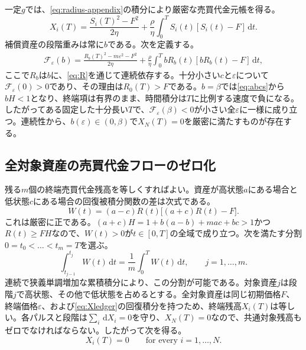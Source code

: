\documentclass[11pt]{article}
\numberwithin{equation}{section}
\theoremstyle{definition}
\theoremstyle{remark}
\newcommand{\dd}{\,\mathrm{d}}
\begin{document}
一定$g$では、\eqref{eq:radius-appendix}の積分により厳密な売買代金元帳を得る。
\begin{equation}\label{eq:Xledger}
X_i(T)=\frac{S_i(T)^2-F^2}{2\eta}
+\frac\rho\eta\int_0^T S_i(t)[S_i(t)-F]\dd t.
\end{equation}
補償資産の段階重みは常に$b$である。次を定義する。
\begin{align}\label{eq:compensator}
\mathcal F_\varepsilon(b)=\frac{R_b(T)^2-m\varepsilon^2-F^2}{2\eta}
+\frac\rho\eta\int_0^T bR_b(t)[bR_b(t)-F]\dd t,
\end{align}
ここで$R_b$は$b$に、\eqref{eq:R}を通じて連続依存する。十分小さい$c$と$\varepsilon$について$\mathcal F_\varepsilon(0)>0$であり、その理由は$R_0(T)>F$である。$b=\beta$では\eqref{eq:abcs}から$bH<1$となり、終端項は有界のまま、時間積分は$T$に比例する速度で負になる。したがってある固定した十分長い$T$で、$\mathcal F_\varepsilon(\beta)<0$が小さい全$\varepsilon$に一様に成り立つ。連続性から、$b(\varepsilon)\in(0,\beta)$で$X_N(T)=0$を厳密に満たすものが存在する。

\subsection{全対象資産の売買代金フローのゼロ化}
残る$m$個の終端売買代金残高を等しくすればよい。資産が高状態$a$にある場合と低状態$c$にある場合の回復被積分関数の差は次式である。
\begin{equation}\label{eq:W}
W(t)=(a-c)R(t)\big[(a+c)R(t)-F\big].
\end{equation}
これは厳密に正である。$(a+c)H=1+b(a-b)+mac+bc>1$かつ$R(t)\ge FH$なので、$W(t)>0$が$t\in[0,T]$の全域で成り立つ。次を満たす分割$0=t_0<\dots<t_m=T$を選ぶ。
\begin{equation}\label{eq:weights}
\int_{t_{j-1}}^{t_j}W(t)\dd t=\frac1m\int_0^T W(t)\dd t,
\qquad j=1,\ldots,m.
\end{equation}
連続で狭義単調増加な累積積分により、この分割が可能である。対象資産$j$は段階$j$で高状態、その他で低状態を占めるとする。全対象資産は同じ初期価格$F$、終端価格$\varepsilon$、および\eqref{eq:Xledger}の回復積分を持つため、終端残高$X_i(T)$は等しい。各パルスと段階は$\sum_i\dd X_i=0$を守り、$X_N(T)=0$なので、共通対象残高もゼロでなければならない。したがって次を得る。
\begin{equation}\label{eq:allclosed}
X_i(T)=0\qquad\text{for every } i=1,\ldots,N.
\end{equation}
\end{document}
